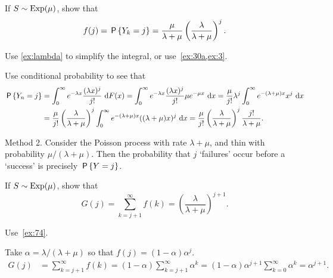 \begin{exercise}\label{ex:74}
 If $S\sim \Exp{\mu}$, show that
 \begin{equation*}
f(j) = \P{Y_k = j} = \frac{\mu}{\lambda+\mu}\left(\frac{\lambda}{\lambda+\mu}\right)^j.
 \end{equation*}
\begin{hint}
Use \cref{ex:lambda} to simplify the integral, or use~\cref{ex:30a,ex:3}.
\end{hint}
\begin{solution}
Use conditional probability to see that
\begin{align*}
 \P{Y_n = j}
&= \int_0^\infty e^{-\lambda x}\frac{(\lambda x)^j}{j!}\, \d F( x) = \int_0^\infty e^{-\lambda x}\frac{(\lambda x)^j}{j!} \mu e^{-\mu x}\, \d x
= \frac{\mu}{j!}\lambda^j \int_0^\infty e^{-(\lambda+\mu) x}x^j\,\d x \\
&= \frac{\mu}{j!}\left(\frac{\lambda}{\lambda+\mu}\right)^j \int_0^\infty e^{-(\lambda+\mu) x}((\lambda+\mu)x)^j\,\d x = \frac{\mu}{j!}\left(\frac{\lambda}{\lambda+\mu}\right)^j \frac{j!}{\lambda+\mu}.
\end{align*}

Method 2. Consider the Poisson process with rate $\lambda+\mu$, and thin with probability $\mu/(\lambda+\mu)$. Then the probability that $j$ `failures' occur before a `success' is precisely $\P{Y=j}$.
\end{solution}
\end{exercise}

\begin{exercise}\label{ex:l-225}
 If $S\sim \Exp{\mu}$, show that
 \begin{equation*}
G(j) = \sum_{k=j+1}^\infty f(k) = \left(\frac{\lambda}{\lambda+\mu}\right)^{j+1}.
 \end{equation*}
\begin{hint}
 Use~\cref{ex:74}.
\end{hint}
\begin{solution}
 Take $\alpha = \lambda/(\lambda+\mu)$ so that
 $f(j) = (1-\alpha) \alpha^j$.
\begin{align*}
 G(j)
&= \sum_{k=j+1}^\infty f(k) = (1-\alpha) \sum_{k=j+1}^\infty \alpha^k  = (1-\alpha) \alpha^{j+1}\sum_{k=0}^\infty \alpha^{k} = \alpha^{j+1}.
\end{align*}
\end{solution}
\end{exercise}


